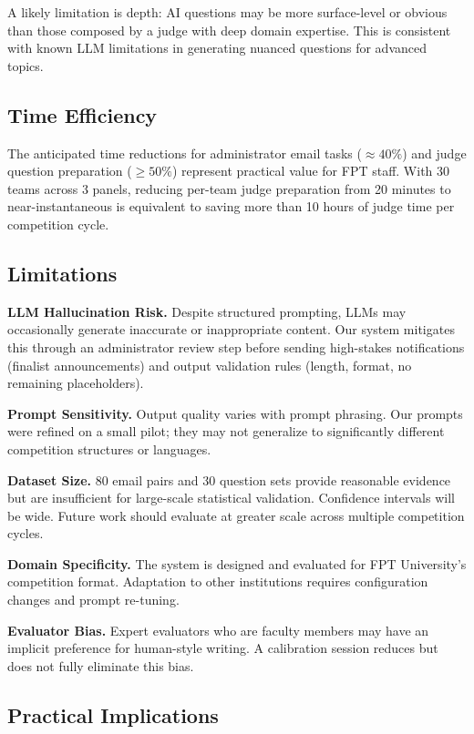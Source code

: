 \documentclass[runningheads]{llncs}
\begin{document}
A likely limitation is depth: AI questions may be more surface-level or obvious than those composed by a judge with deep domain expertise. This is consistent with known LLM limitations in generating nuanced questions for advanced topics.

\subsection{Time Efficiency}

The anticipated time reductions for administrator email tasks ($\approx 40\%$) and judge question preparation ($\geq 50\%$) represent practical value for FPT staff. With 30 teams across 3 panels, reducing per-team judge preparation from 20 minutes to near-instantaneous is equivalent to saving more than 10 hours of judge time per competition cycle.

\subsection{Limitations}

\textbf{LLM Hallucination Risk.} Despite structured prompting, LLMs may occasionally generate inaccurate or inappropriate content. Our system mitigates this through an administrator review step before sending high-stakes notifications (finalist announcements) and output validation rules (length, format, no remaining placeholders).

\textbf{Prompt Sensitivity.} Output quality varies with prompt phrasing. Our prompts were refined on a small pilot; they may not generalize to significantly different competition structures or languages.

\textbf{Dataset Size.} 80 email pairs and 30 question sets provide reasonable evidence but are insufficient for large-scale statistical validation. Confidence intervals will be wide. Future work should evaluate at greater scale across multiple competition cycles.

\textbf{Domain Specificity.} The system is designed and evaluated for FPT University's competition format. Adaptation to other institutions requires configuration changes and prompt re-tuning.

\textbf{Evaluator Bias.} Expert evaluators who are faculty members may have an implicit preference for human-style writing. A calibration session reduces but does not fully eliminate this bias.

\subsection{Practical Implications}
\end{document}
